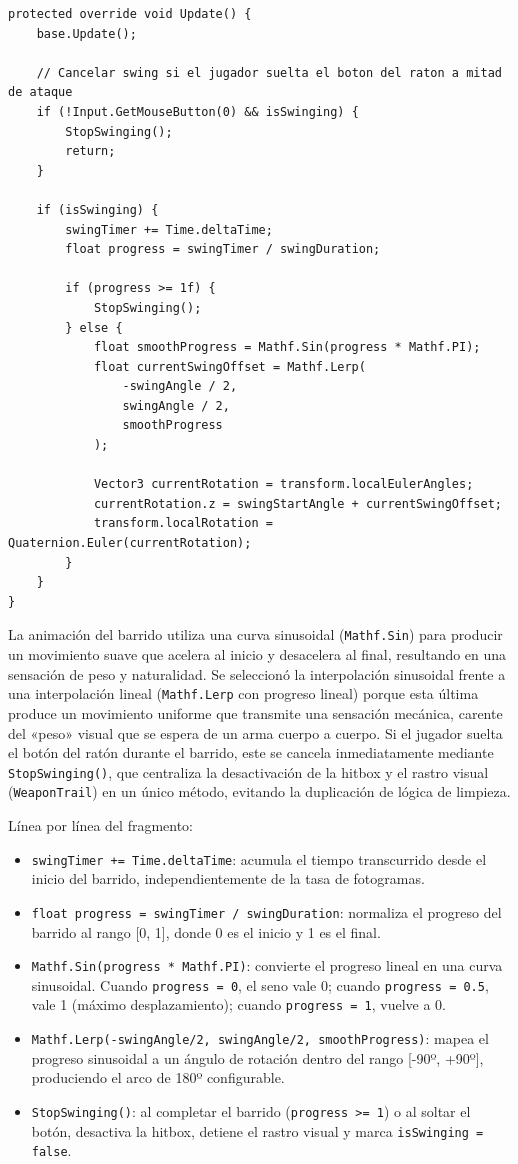 \begin{lstlisting}
protected override void Update() {
    base.Update();
    
    // Cancelar swing si el jugador suelta el boton del raton a mitad de ataque
    if (!Input.GetMouseButton(0) && isSwinging) {
        StopSwinging();
        return;
    }
    
    if (isSwinging) {
        swingTimer += Time.deltaTime;
        float progress = swingTimer / swingDuration;
        
        if (progress >= 1f) {
            StopSwinging();
        } else {
            float smoothProgress = Mathf.Sin(progress * Mathf.PI);
            float currentSwingOffset = Mathf.Lerp(
                -swingAngle / 2, 
                swingAngle / 2, 
                smoothProgress
            );
            
            Vector3 currentRotation = transform.localEulerAngles;
            currentRotation.z = swingStartAngle + currentSwingOffset;
            transform.localRotation = Quaternion.Euler(currentRotation);
        }
    }
}
\end{lstlisting}


La animación del barrido utiliza una curva sinusoidal (\texttt{Mathf.Sin}) para producir un movimiento suave que acelera al inicio y desacelera al final, resultando en una sensación de peso y naturalidad. Se seleccionó la interpolación sinusoidal frente a una interpolación lineal (\texttt{Mathf.Lerp} con progreso lineal) porque esta última produce un movimiento uniforme que transmite una sensación mecánica, carente del «peso» visual que se espera de un arma cuerpo a cuerpo. Si el jugador suelta el botón del ratón durante el barrido, este se cancela inmediatamente mediante \texttt{StopSwinging()}, que centraliza la desactivación de la hitbox y el rastro visual (\texttt{WeaponTrail}) en un único método, evitando la duplicación de lógica de limpieza.

Línea por línea del fragmento:

\begin{itemize}
\item \texttt{swingTimer += Time.deltaTime}: acumula el tiempo transcurrido desde el inicio del barrido, independientemente de la tasa de fotogramas.
\item \texttt{float progress = swingTimer / swingDuration}: normaliza el progreso del barrido al rango [0, 1], donde 0 es el inicio y 1 es el final.
\item \texttt{Mathf.Sin(progress * Mathf.PI)}: convierte el progreso lineal en una curva sinusoidal. Cuando \texttt{progress = 0}, el seno vale 0; cuando \texttt{progress = 0.5}, vale 1 (máximo desplazamiento); cuando \texttt{progress = 1}, vuelve a 0.
\item \texttt{Mathf.Lerp(-swingAngle/2, swingAngle/2, smoothProgress)}: mapea el progreso sinusoidal a un ángulo de rotación dentro del rango [-90º, +90º], produciendo el arco de 180º configurable.
\item \texttt{StopSwinging()}: al completar el barrido (\texttt{progress >= 1}) o al soltar el botón, desactiva la hitbox, detiene el rastro visual y marca \texttt{isSwinging = false}.
\end{itemize}

